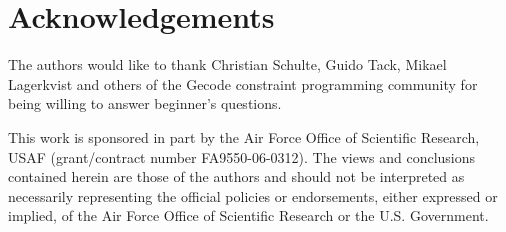 \section{Acknowledgements}

The authors would like to thank Christian Schulte, Guido Tack, Mikael Lagerkvist and others of the Gecode constraint programming community for being willing to answer beginner's questions.   

This work is sponsored in part by the Air Force Office of Scientific Research, USAF (grant/contract number FA9550-06-0312).  The views and conclusions contained herein are those of the authors and should not be interpreted as necessarily representing the official policies or endorsements, either expressed or implied, of the Air Force Office of Scientific Research or the U.S. Government.
